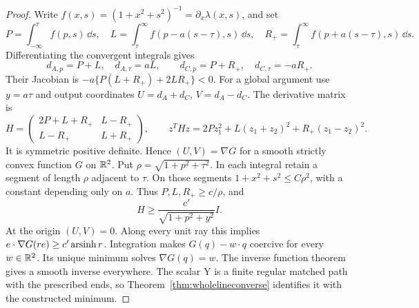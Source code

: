 \begin{proof}
Write $f(x,s)=(1+x^2+s^2)^{-1}=\partial_x\lambda(x,s)$,
and set
\[
 P=\int_{-\infty}^\tau f(p,s)\,\dd s,\quad
 L=\int_\tau^\infty f(p-a(s-\tau),s)\,\dd s,\quad
 R_+=\int_\tau^\infty f(p+a(s-\tau),s)\,\dd s.
\]
Differentiating the convergent integrals gives
\[
 d_{A,p}=P+L,\quad d_{A,\tau}=aL,\qquad
 d_{C,p}=P+R_+,\quad d_{C,\tau}=-aR_+.
\]
Their Jacobian is $-a\{P(L+R_+)+2LR_+\}<0$.
For a global argument use $y=a\tau$ and output coordinates
$U=d_A+d_C$, $V=d_A-d_C$. The derivative matrix is
\[
 H=\begin{pmatrix}2P+L+R_+&L-R_+\\ L-R_+&L+R_+\end{pmatrix},
 \qquad
 z^THz=2Pz_1^2+L(z_1+z_2)^2+R_+(z_1-z_2)^2.
\]
It is symmetric positive definite. Hence $(U,V)=\nabla G$
for a smooth strictly convex function $G$ on $\mathbb R^2$.
Put $\rho=\sqrt{1+p^2+\tau^2}$. In each integral retain a
segment of length $\rho$ adjacent to $\tau$. On those segments
$1+x^2+s^2\le C\rho^2$, with a constant depending only on
$a$. Thus $P,L,R_+\ge c/\rho$, and
\[
 H\ge\frac{c'}{\sqrt{1+p^2+y^2}}I.
\]
At the origin $(U,V)=0$. Along every unit ray this implies
$e\cdot\nabla G(re)\ge c'\operatorname{arsinh} r$. Integration makes
$G(q)-w\cdot q$ coercive for every $w\in\mathbb R^2$.
Its unique minimum solves $\nabla G(q)=w$. The inverse
function theorem gives a smooth inverse everywhere.
The scalar Y is a finite regular matched path with the prescribed
ends, so Theorem~\ref{thm:wholelineconverse} identifies it
with the constructed minimum.
\end{proof}


